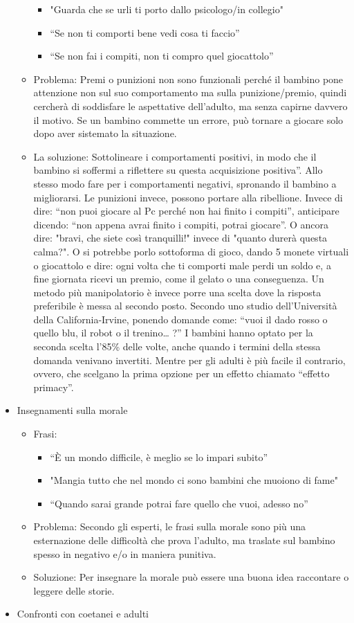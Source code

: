 \documentclass[12pt]{book} %
\begin{document}
\begin{itemize}
\begin{itemize}
\begin{itemize}
\item "Guarda che se urli ti porto dallo psicologo/in collegio"
\item “Se non ti comporti bene vedi cosa ti faccio”
\item “Se non fai i compiti, non ti compro quel giocattolo”
\end{itemize}
\item Problema: Premi o punizioni non sono funzionali perché il bambino pone attenzione non sul suo comportamento ma
sulla punizione/premio, quindi cercherà di soddisfare le aspettative dell'adulto, ma senza capirne
davvero il motivo. Se un bambino commette un errore, può tornare a giocare solo dopo aver sistemato la situazione.
\item La soluzione: Sottolineare i comportamenti positivi, in modo che il bambino si soffermi a riflettere su questa
acquisizione positiva”. Allo stesso modo fare per i comportamenti negativi, spronando il bambino a migliorarsi. 
Le punizioni invece, possono portare alla ribellione.
Invece di dire: “non puoi giocare al Pc perché non hai finito i compiti”, anticipare dicendo: 
“non appena avrai finito i compiti, potrai giocare”. O ancora dire: "bravi, che siete così tranquilli!" invece di "quanto durerà questa calma?".
O si potrebbe porlo sottoforma di gioco, dando 5 monete virtuali o giocattolo e dire: ogni volta che ti comporti male perdi un soldo e, a fine giornata ricevi un premio, come il gelato o una conseguenza.
Un metodo più manipolatorio è invece porre una scelta dove la risposta preferibile è messa al
secondo posto. Secondo uno studio dell'Università della California-Irvine, ponendo domande come: “vuoi il dado rosso o
quello blu, il robot o il trenino… ?” I bambini hanno optato per la seconda scelta l'85\% delle volte, anche quando i
termini della stessa domanda venivano invertiti. Mentre per gli adulti è più facile il contrario, ovvero, che scelgano
la prima opzione per un effetto chiamato “effetto primacy”. 
\end{itemize}
\item Insegnamenti sulla morale

\begin{itemize}
\item Frasi:

\begin{itemize}
\item “È un mondo difficile, è meglio se lo impari subito”
\item "Mangia tutto che nel mondo ci sono bambini che muoiono di fame"
\item “Quando sarai grande potrai fare quello che vuoi, adesso no”
\end{itemize}
\item Problema: Secondo gli esperti, le frasi sulla morale sono più una esternazione delle difficoltà che prova
l'adulto, ma traslate sul bambino spesso in negativo e/o in maniera punitiva.
\item Soluzione: Per insegnare la morale può essere una buona idea raccontare o leggere delle storie.
\end{itemize}
\item Confronti con coetanei e adulti


\end{itemize}
\end{document}

